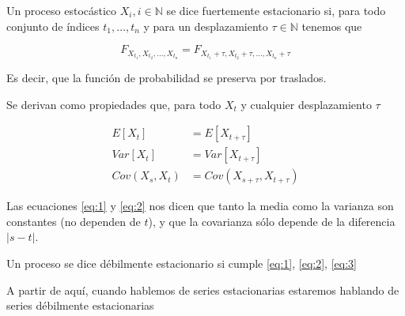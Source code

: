 \begin{definicion}
Un proceso estocástico $X_i, i \in \mathbb{N}$ se dice fuertemente estacionario si, para todo conjunto de índices $t_1, \ldots , t_n$ y para un desplazamiento $\tau \in \mathbb{N}$ tenemos que

\begin{displaymath}
    F_{X_{t_1}, X_{t_2}, \ldots , X_{t_n} } = F_{X_{t_1} + \tau, X_{t_2} + \tau, \ldots , X_{t_n} + \tau}
\end{displaymath}

Es decir, que la función de probabilidad se preserva por traslados.
\end{definicion}

Se derivan como propiedades que, para todo $X_t$ y cualquier desplazamiento $\tau$

\begin{align}
    E[X_t] &= E[X_{t + \tau}] \label{eq:1} \\
    Var[X_t] &= Var[X_{t + \tau}] \label{eq:2} \\
    Cov(X_s, X_t) &= Cov(X_{s+\tau}, X_{t + \tau}) \label{eq:3}
\end{align}

Las ecuaciones \ref{eq:1} y \ref{eq:2} nos dicen que tanto la media como la varianza son constantes (no dependen de $t$), y que la covarianza sólo depende de la diferencia $| s - t |$.


\begin{definicion}
    Un proceso se dice débilmente estacionario si cumple \ref{eq:1}, \ref{eq:2}, \ref{eq:3}
\end{definicion}

A partir de aquí, cuando hablemos de series estacionarias estaremos hablando de series débilmente estacionarias

